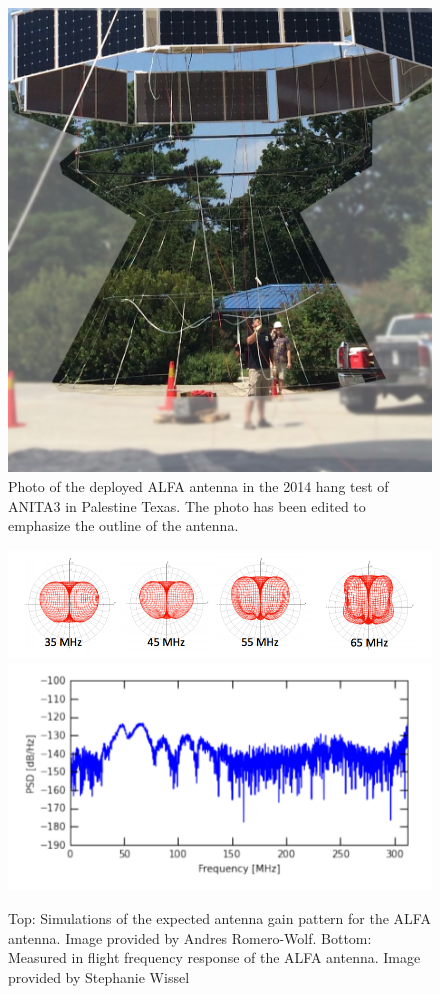 \begin{figure}
\centering
	\includegraphics[width=\textwidth]{figures/ALFA_pic}
	\caption{Photo of the deployed ALFA antenna in the 2014 hang test of ANITA3 in Palestine Texas.  The photo has been edited to emphasize the outline of the antenna.}
	\label{fig:ALFA_pic}
\end{figure}

\begin{figure}
\centering
	\includegraphics[width=\textwidth]{figures/ALFA_gainPattern}
	\includegraphics[width=\textwidth]{figures/ALFA_gain}
	\caption{Top: Simulations of the expected antenna gain pattern for the ALFA antenna.  Image provided by Andres Romero-Wolf.  Bottom: Measured in flight frequency response of the ALFA antenna.  Image provided by Stephanie Wissel}
	\label{fig:ALFA}
\end{figure}

